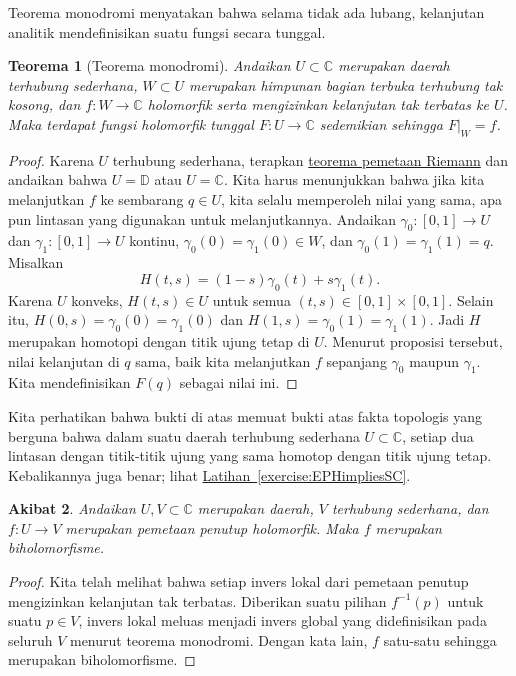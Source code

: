 \documentclass[12pt,openany]{book}
\newcommand{\C}{{\mathbb{C}}}
\newcommand{\D}{{\mathbb{D}}}
\theoremstyle{plain}
\newtheorem{thm}{Teorema}[section]
\newtheorem{cor}[thm]{Akibat}
\theoremstyle{remark}
\theoremstyle{definition}
\theoremstyle{exercise}
\theoremstyle{example}
\newcommand{\exerciseref}[1]{\hyperref[#1]{Latihan~\ref*{#1}}}
\begin{document}
Teorema monodromi menyatakan bahwa selama tidak ada
lubang, kelanjutan analitik mendefinisikan suatu fungsi secara tunggal.

\begin{thm}[Teorema monodromi]
Andaikan $U \subset \C$ merupakan daerah terhubung sederhana, $W \subset U$ merupakan
himpunan bagian terbuka terhubung tak kosong, dan
$f \colon W \to \C$ holomorfik serta mengizinkan kelanjutan tak terbatas
ke $U$.  Maka terdapat
fungsi holomorfik tunggal $F \colon U \to \C$ sedemikian sehingga $F|_W = f$.
\end{thm}

\begin{proof}
Karena $U$ terhubung sederhana, terapkan
\hyperref[thm:RMT]{teorema pemetaan Riemann}
dan
andaikan bahwa $U=\D$ atau $U = \C$.
Kita harus menunjukkan bahwa jika kita melanjutkan $f$ ke sembarang $q \in U$, kita
selalu memperoleh nilai yang sama,
apa pun lintasan yang digunakan untuk melanjutkannya.
Andaikan $\gamma_0 \colon [0,1] \to U$ dan
$\gamma_1 \colon [0,1] \to U$ kontinu,
$\gamma_0(0)=\gamma_1(0) \in W$,
dan
$\gamma_0(1)=\gamma_1(1)=q$.  Misalkan
\begin{equation*}
H(t,s) = (1-s)\gamma_0(t)+s\gamma_1(t) .
\end{equation*}
Karena $U$ konveks, $H(t,s) \in U$ untuk semua $(t,s) \in
[0,1]\times[0,1]$.  Selain itu,
$H(0,s) = \gamma_0(0)=\gamma_1(0)$ dan
$H(1,s) = \gamma_0(1)=\gamma_1(1)$.  Jadi $H$ merupakan homotopi dengan titik ujung tetap di
$U$. Menurut proposisi tersebut, nilai kelanjutan di
$q$ sama, baik kita melanjutkan $f$ sepanjang $\gamma_0$ maupun $\gamma_1$.
Kita mendefinisikan $F(q)$ sebagai nilai ini.
\end{proof}

Kita perhatikan bahwa bukti di atas memuat
bukti atas fakta topologis yang berguna bahwa dalam suatu
daerah terhubung sederhana $U \subset \C$, setiap dua 
lintasan dengan titik-titik ujung yang sama homotop dengan titik ujung tetap.
Kebalikannya juga benar; lihat
\exerciseref{exercise:EPHimpliesSC}.

\begin{cor}
Andaikan $U,V \subset \C$ merupakan daerah, $V$ terhubung sederhana,
dan $f \colon U \to V$ merupakan pemetaan penutup holomorfik.
Maka $f$ merupakan biholomorfisme.
\end{cor}

\begin{proof}
Kita telah melihat bahwa setiap invers lokal dari pemetaan penutup mengizinkan kelanjutan
tak terbatas.  Diberikan suatu pilihan $f^{-1}(p)$ untuk suatu $p \in V$,
invers lokal meluas menjadi invers global yang didefinisikan pada seluruh $V$ menurut teorema monodromi.
Dengan kata lain, $f$ satu-satu sehingga merupakan biholomorfisme.
\end{proof}
\end{document}
